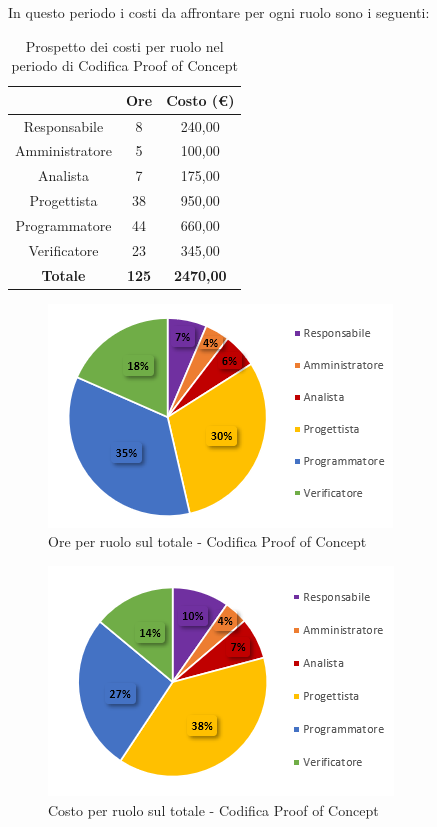 \pagebreak
   In questo periodo i costi da affrontare per ogni ruolo sono i seguenti:
   
   \begin{table}[H]
       \centering
       \renewcommand{\arraystretch}{1.8}
       \begin{tabular}{c|c|c}
         \rowcolor[HTML]{125E28} 
         \multicolumn{1}{c}{\color[HTML]{FFFFFF}\textbf{Ruolo}}
         & \multicolumn{1}{c}{\color[HTML]{FFFFFF}\textbf{Ore}}
         & \multicolumn{1}{c}{\color[HTML]{FFFFFF}\textbf{Costo (€)}}\\
         \hline
         Responsabile   & 8 & 240,00\\
         Amministratore & 5 & 100,00\\
         Analista       & 7 & 175,00\\
         Progettista    & 38 & 950,00\\
         Programmatore  & 44 & 660,00\\
         Verificatore   & 23 & 345,00\\
         \textbf{Totale} & \textbf{125} & \textbf{2470,00}
       \end{tabular}
       \caption{Prospetto dei costi per ruolo nel periodo di Codifica Proof of Concept}
     \end{table}
   
     \begin{figure}[H]
       \centering
        \includegraphics[scale=1]{immagini/ore_ruolo_PoC.png}
        \caption{Ore per ruolo sul totale - Codifica Proof of Concept}
      \end{figure}
   
     \begin{figure}[H]
       \centering
        \includegraphics[scale=1]{immagini/costo_ruolo_PoC.png}
        \caption{Costo per ruolo sul totale - Codifica Proof of Concept}
      \end{figure}
   
